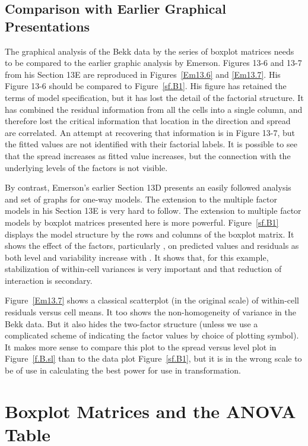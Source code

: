\subsection*{Comparison with Earlier Graphical Presentations}

The graphical analysis of the Bekk data by the series of boxplot matrices needs
to be compared to the earlier graphic analysis by Emerson.  Figures 13-6
and 13-7 from his Section 13E are reproduced in Figures~\ref{Em13.6} and
\ref{Em13.7}.  His Figure
13-6 should be compared to Figure~\ref{sf.B1}.	His figure has retained
the terms of model specification, but it has lost the detail of the factorial
structure.  It has combined the residual information from all the cells into a
single column, and therefore lost the critical information that location in the
 direction and spread are correlated.  An attempt at recovering
that information is in Figure 13-7, but the fitted values are not identified
with their factorial labels.  It is possible to see that the spread increases
as fitted value increases, but the connection with the underlying levels of the
factors is not visible.

By contrast, Emerson's earlier Section 13D presents an easily followed analysis
and set
of graphs for one-way models.  The extension to the multiple factor models in
his Section 13E is very hard to follow.  The extension to multiple factor
models by boxplot matrices presented here is more powerful.
Figure~\ref{sf.B1} displays the model structure by the rows and columns of
the boxplot matrix.  It shows the effect of the factors, particularly
, on predicted values and residuals as both level and variability
increase with .  It shows that, for this example, stabilization of
within-cell variances is very important and that reduction of interaction is
secondary.

Figure~\ref{Em13.7} shows a classical scatterplot (in the original
scale) of within-cell residuals versus cell means.  It too shows the
non-homogeneity of variance in the Bekk data.  But it also hides the two-factor
structure (unless we use a complicated scheme of indicating the factor values
by choice of plotting symbol).	It makes more sense to compare this plot to the
spread versus level plot in Figure~\ref{f.B.sl} than to the data plot
Figure~\ref{sf.B1}, but it is in the wrong scale to be of use in
calculating the best power for use in transformation.



\section{Boxplot Matrices and the ANOVA Table}
\label{sec.math}


